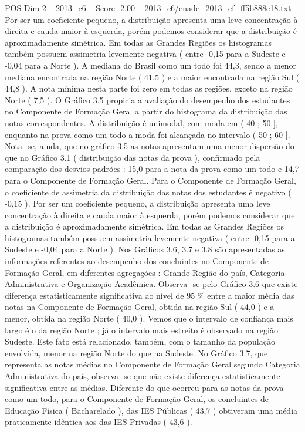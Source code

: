 \begin{textsample}{POS Dim 2 – 2013\_c6 – Score -2.00 – 2013\_c6/enade\_2013\_ef\_ff5b888e18.txt}
Por ser um coeficiente pequeno, a distribuição apresenta uma leve concentração à direita e cauda maior à esquerda, porém podemos considerar que a distribuição é aproximadamente simétrica.
Em todas as Grandes Regiões os histogramas também possuem assimetria levemente negativa ( entre -0,15 para a Sudeste e -0,04 para a Norte ).
A mediana do Brasil como um todo foi 44,3, sendo a menor mediana encontrada na região Norte ( 41,5 ) e a maior encontrada na região Sul ( 44,8 ).
A nota mínima nesta parte foi zero em todas as regiões, exceto na região Norte ( 7,5 ).
O Gráfico 3.5 propicia a avaliação do desempenho dos estudantes no Componente de Formação Geral a partir do histograma da distribuição das notas correspondentes.
A distribuição é unimodal, com moda em ( 40 ; 50 ], enquanto na prova como um todo a moda foi alcançada no intervalo ( 50 ; 60 ].
Nota -se, ainda, que no gráfico 3.5 as notas apresentam uma menor dispersão do que no Gráfico 3.1 ( distribuição das notas da prova ), confirmado pela comparação dos desvios padrões : 15,0 para a nota da prova como um todo e 14,7 para o Componente de Formação Geral.
Para o Componente de Formação Geral, o coeficiente de assimetria da distribuição das notas dos estudantes é negativo ( -0,15 ).
Por ser um coeficiente pequeno, a distribuição apresenta uma leve concentração à direita e cauda maior à esquerda, porém podemos considerar que a distribuição é aproximadamente simétrica.
Em todas as Grandes Regiões os histogramas também possuem assimetria levemente negativa ( entre -0,15 para a Sudeste e -0,04 para a Norte ).
Nos Gráficos 3.6, 3.7 e 3.8 são apresentadas as informações referentes ao desempenho dos concluintes no Componente de Formação Geral, em diferentes agregações : Grande Região do país, Categoria Administrativa e Organização Acadêmica.
Observa -se pelo Gráfico 3.6 que existe diferença estatisticamente significativa ao nível de 95 \% entre a maior média das notas na Componente de Formação Geral, obtida na região Sul ( 44,0 ) e a menor, obtida na região Norte ( 40,0 ).
Vemos que o intervalo de confiança mais largo é o da região Norte ; já o intervalo mais estreito é observado na região Sudeste.
Este fato está relacionado, também, com o tamanho da população envolvida, menor na região Norte do que na Sudeste.
No Gráfico 3.7, que representa as notas médias no Componente de Formação Geral segundo Categoria Administrativa do país, observa -se que não existe diferença estatisticamente significativa entre as médias.
Diferente do que ocorreu para as notas da prova como um todo, para o Componente de Formação Geral, os concluintes de Educação Física ( Bacharelado ), das IES Públicas ( 43,7 ) obtiveram uma média praticamente idêntica aos das IES Privadas ( 43,6 ).

\end{textsample}
